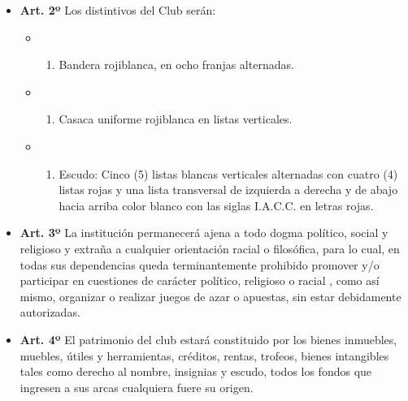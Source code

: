 \documentclass[]{book}
\providecommand{\tightlist}{%
  \setlength{\itemsep}{0pt}\setlength{\parskip}{0pt}}
\begin{document}
\begin{itemize}
\tightlist
\item
  \textbf{Art. 2º} Los distintivos del Club serán:

  \begin{itemize}
  \item
    \begin{enumerate}
    \def\labelenumi{\alph{enumi})}
    \tightlist
    \item
      Bandera rojiblanca, en ocho franjas alternadas.
    \end{enumerate}
  \item
    \begin{enumerate}
    \def\labelenumi{\alph{enumi})}
    \setcounter{enumi}{1}
    \tightlist
    \item
      Casaca uniforme rojiblanca en listas verticales.
    \end{enumerate}
  \item
    \begin{enumerate}
    \def\labelenumi{\alph{enumi})}
    \setcounter{enumi}{2}
    \tightlist
    \item
      Escudo: Cinco (5) listas blancas verticales alternadas con cuatro
      (4) listas rojas y una lista transversal de izquierda a derecha y
      de abajo hacia arriba color blanco con las siglas I.A.C.C. en
      letras rojas.
    \end{enumerate}
  \end{itemize}
\end{itemize}

\begin{itemize}
\tightlist
\item
  \textbf{Art. 3º} La institución permanecerá ajena a todo dogma
  político, social y religioso y extraña a cualquier orientación racial
  o filosófica, para lo cual, en todas sus dependencias queda
  terminantemente prohibido promover y/o participar en cuestiones de
  carácter político, religioso o racial , como así mismo, organizar o
  realizar juegos de azar o apuestas, sin estar debidamente autorizadas.
\end{itemize}

\begin{itemize}
\tightlist
\item
  \textbf{Art. 4º} El patrimonio del club estará constituido por los
  bienes inmuebles, muebles, útiles y herramientas, créditos, rentas,
  trofeos, bienes intangibles tales como derecho al nombre, insignias y
  escudo, todos los fondos que ingresen a sus arcas cualquiera fuere su
  origen.
\end{itemize}
\end{document}
